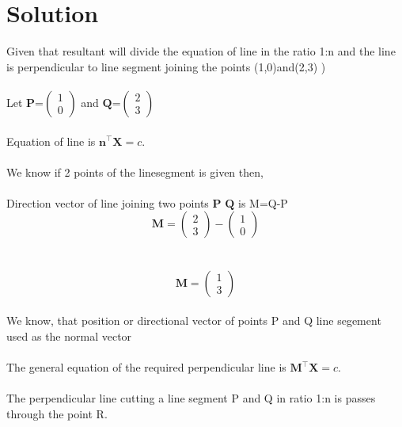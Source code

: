 \documentclass[journal,12pt,twocolumn]{article}
\newcommand{\myvec}[1]{\ensuremath{\begin{pmatrix}#1\end{pmatrix}}}
\let\vec\mathbf
\begin{document}
\section{Solution}
Given that resultant will divide the equation of line in the ratio 1:n and the line is perpendicular to line segment joining the points (1,0)and(2,3)  ) \\
\\
Let ${\vec{P}}$=$\myvec{
  1\\
  0}$
 and ${\vec{Q}}$=$\myvec{
  2\\
  3}$
\\
\\
Equation of line is ${\vec{n^{\top}}\vec{X}} = c$.
\\
\\
We know if 2 points of the linesegment is given then,\\
\\
Direction vector of line joining two points  ${\vec{P}}$ ${\vec{Q}}$ is M=Q-P\\

\begin{equation}
	\vec{M}=
     \myvec{
  2\\
  3
 }-  \myvec{
  1\\
  0
 }
  \label{eq-2}
\end{equation}
\\
\\
\begin{equation}
	\vec{M}=
     \myvec{
  1\\
  3
 }
   \label{eq-2}
\end{equation}
\\
We know, that position or  directional vector of points P and Q line segement used as the normal vector
\\
\\
 The general equation of the required perpendicular line is
 ${\vec{M^{\top}}\vec{X}} = c$.
 \\
 \\
 The perpendicular line cutting a line segment P and Q in ratio 1:n is passes through the point R.
 
\end{document}
